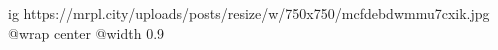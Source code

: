 
 
 
 
 

\ifcmt
  ig https://mrpl.city/uploads/posts/resize/w/750x750/mcfdebdwmmu7cxik.jpg
  @wrap center
  @width 0.9
\fi
